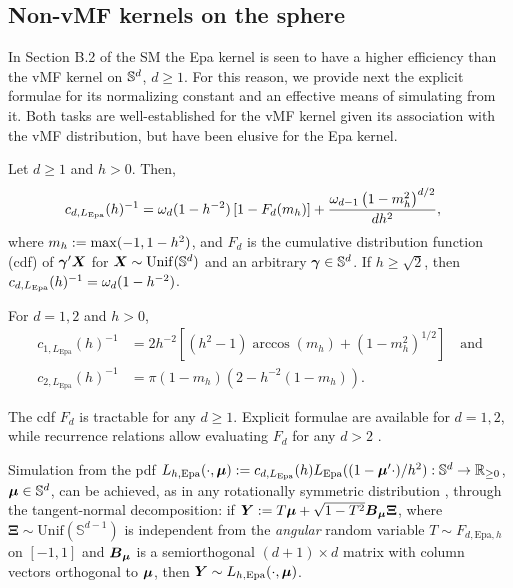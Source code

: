 \documentclass[oneside,11pt]{article}
\begin{document}
\subsection{Non-vMF kernels on the sphere}
\label{sec:nonvMFker}

In Section B.2 of the SM the Epa kernel is seen to have a higher efficiency than the vMF kernel on $\mathbb{S}^{d}$, $d\geq 1$. For this reason, we provide next the explicit formulae for its normalizing constant and an effective means of simulating from it. Both tasks are well-established for the vMF kernel given its association with the vMF distribution, but have been elusive for the Epa kernel.

\begin{proposition}\label{prop:Epa1}
Let $d\geq 1$ and $h>0$. Then,
\begin{align*}
    c_{d,L_\mathrm{Epa}}(h)^{-1}&=\omega_{d}(1-h^{-2})\left[1-F_d(m_h)\right]+\frac{\omega_{d-1}\left(1-m_h^2\right)^{d/2}}{dh^{2}},
\end{align*}
where $m_h:=\max(-1,1-h^2)$, and $F_d$ is the cumulative distribution function (cdf) of $\boldsymbol\gamma'\boldsymbol{X}$ for  $\boldsymbol{X}\sim\mathrm{Unif}(\mathbb{S}^{d})$ and an arbitrary $\boldsymbol\gamma\in\mathbb{S}^{d}$. If $h\geq\sqrt{2}$, then $c_{d,L_\mathrm{Epa}}(h)^{-1}=\omega_{d}(1-h^{-2})$.

For $d=1,2$ and $h>0$,
\begin{align*}
    c_{1,L_\mathrm{Epa}}(h)^{-1}&=2h^{-2}[(h^2-1)\arccos(m_h)+(1-m_h^2)^{1/2}]\quad\text{and}\\
    c_{2,L_\mathrm{Epa}}(h)^{-1}&=\pi(1-m_h)(2-h^{-2}(1-m_h)).
\end{align*}
\end{proposition}

The cdf $F_d$ is tractable for any $d\geq 1$. Explicit formulae are available for $d=1,2$, while recurrence relations allow evaluating $F_d$ for any $d>2$ \citep[see, e.g., Section 2.2 in][]{Garcia-Portugues2022}.

Simulation from the pdf $L_{h,\mathrm{Epa}}(\cdot,\boldsymbol\mu):=c_{d,L_\mathrm{Epa}}(h)L_{\mathrm{Epa}}((1-\boldsymbol\mu'\cdot)/h^2):\mathbb{S}^{d}\to \mathbb{R}_{\geq0}$, $\boldsymbol\mu\in\mathbb{S}^{d}$, can be achieved, as in any rotationally symmetric distribution \citep[see][for the vMF case]{Wood1994}, through the tangent-normal decomposition: if $\boldsymbol{Y}:= T\boldsymbol\mu + \sqrt{1-T^2}\boldsymbol{B}_{\boldsymbol\mu}\boldsymbol{\Xi}$, where $\boldsymbol{\Xi}\sim\mathrm{Unif}(\mathbb{S}^{d-1})$ is independent from the \emph{angular} random variable $T \sim F_{d,\mathrm{Epa},h}$ on $[-1,1]$ and $\boldsymbol{B}_{\boldsymbol\mu}$ is a semiorthogonal $(d+1)\times d$ matrix with column vectors orthogonal to $\boldsymbol\mu$, then $\boldsymbol{Y}\sim L_{h,\mathrm{Epa}}(\cdot,\boldsymbol\mu)$. %
\end{document}
